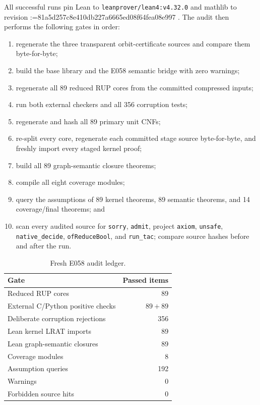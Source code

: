 \documentclass[11pt,reqno,a4paper]{amsart}
\makeatletter
\theoremstyle{definition}
\theoremstyle{remark}
\newcommand{\sha}[1]{%
  \begingroup\ttfamily\small
  \@tfor\@tempa:=#1\do{\@tempa\hspace{0pt}}%
  \endgroup}
\newcommand{\code}[1]{\texttt{#1}}
\makeatother
\begin{document}
All successful runs pin Lean to \code{leanprover/lean4:v4.32.0} and mathlib to revision
\sha{81a5d257c8e410db227a6665ed08f64fea08e997}.  The audit then performs the
following gates in order:
\begin{enumerate}[leftmargin=2.2em]
\item regenerate the three transparent orbit-certificate sources and compare
      them byte-for-byte;
\item build the base library and the E058 semantic bridge with zero warnings;
\item regenerate all 89 reduced RUP cores from the committed compressed
      inputs;
\item run both external checkers and all 356 corruption tests;
\item regenerate and hash all 89 primary unit CNFs;
\item re-split every core, regenerate each committed stage source
      byte-for-byte, and freshly import every staged kernel proof;
\item build all 89 graph-semantic closure theorems;
\item compile all eight coverage modules;
\item query the assumptions of 89 kernel theorems, 89 semantic theorems, and
      14 coverage/final theorems; and
\item scan every audited source for \code{sorry}, \code{admit}, project
      \code{axiom}, \code{unsafe}, \code{native\_decide},
      \code{ofReduceBool}, and \code{run\_tac}; compare source hashes before
      and after the run.
\end{enumerate}

\begin{table}[ht]
\centering
\caption{Fresh E058 audit ledger.}
\label{tab:audit}
\begin{tabular}{@{}lr@{}}
\toprule
Gate & Passed items\\
\midrule
Reduced RUP cores & 89\\
External C/Python positive checks & \(89+89\)\\
Deliberate corruption rejections & 356\\
Lean kernel LRAT imports & 89\\
Lean graph-semantic closures & 89\\
Coverage modules & 8\\
Assumption queries & 192\\
Warnings & 0\\
Forbidden source hits & 0\\
\bottomrule
\end{tabular}
\end{table}
\end{document}
